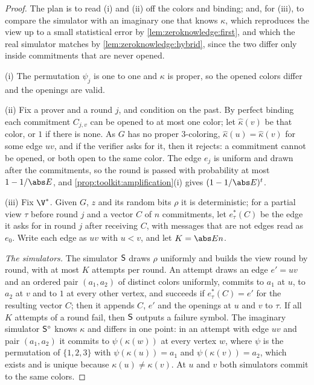 \begin{refsection}
\begin{proof}
The plan is to read (i) and (ii) off the colors and binding; and, for (iii), to compare the simulator with an imaginary one that knows $\kappa$, which reproduces the view up to a small statistical error by \cref{lem:zeroknowledge:first}, and which the real simulator matches by \cref{lem:zeroknowledge:hybrid}, since the two differ only inside commitments that are never opened.

(i) The permutation $\psi_j$ is one to one and $\kappa$ is proper, so the opened colors differ and the openings are valid.

(ii) Fix a prover and a round $j$, and condition on the past. By perfect binding each commitment $C_{j,v}$ can be opened to at most one color; let $\hat\kappa(v)$ be that color, or $1$ if there is none. As $G$ has no proper 3-coloring, $\hat\kappa(u)=\hat\kappa(v)$ for some edge $uv$, and if the verifier asks for it, then it rejects: a commitment cannot be opened, or both open to the same color. The edge $e_j$ is uniform and drawn after the commitments, so the round is passed with probability at most $1-1/\abs E$, and \cref{prop:toolkit:amplification}(i) gives $(1-1/\abs E)^t$.

(iii) Fix $\V^*$. Given $G$, $z$ and its random bits $\rho$ it is deterministic; for a partial view $\tau$ before round $j$ and a vector $C$ of $n$ commitments, let $e^*_\tau(C)$ be the edge it asks for in round $j$ after receiving $C$, with messages that are not edges read as $e_0$. Write each edge as $uv$ with $u<v$, and let $K=\abs En$.

\emph{The simulators.} The simulator $\mathsf{S}$ draws $\rho$ uniformly and builds the view round by round, with at most $K$ attempts per round. An attempt draws an edge $e'=uv$ and an ordered pair $(a_1,a_2)$ of distinct colors uniformly, commits to $a_1$ at $u$, to $a_2$ at $v$ and to $1$ at every other vertex, and succeeds if $e^*_\tau(C)=e'$ for the resulting vector $C$; then it appends $C$, $e'$ and the openings at $u$ and $v$ to $\tau$. If all $K$ attempts of a round fail, then $\mathsf{S}$ outputs a failure symbol. The imaginary simulator $\mathsf{S}^\circ$ knows $\kappa$ and differs in one point: in an attempt with edge $uv$ and pair $(a_1,a_2)$ it commits to $\psi(\kappa(w))$ at every vertex $w$, where $\psi$ is the permutation of $\{1,2,3\}$ with $\psi(\kappa(u))=a_1$ and $\psi(\kappa(v))=a_2$, which exists and is unique because $\kappa(u)\ne\kappa(v)$. At $u$ and $v$ both simulators commit to the same colors.


\end{proof}
\end{refsection}
